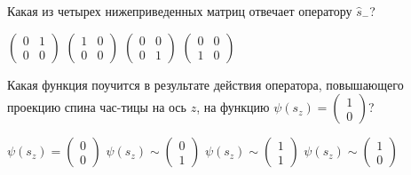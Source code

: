\documentclass[11pt,a4paper]{exam}
\begin{document}
\begin{questions}
\question Какая из четырех нижеприведенных матриц отвечает оператору ${\hat s_ - }$?
\begin{choices}
\choice $\left( {\begin{array}{*{20}{c}}
0&1\\
0&0
\end{array}} \right)$      
\choice $\left( {\begin{array}{*{20}{c}}
1&0\\
0&0
\end{array}} \right)$      
\choice $\left( {\begin{array}{*{20}{c}}
0&0\\
0&1
\end{array}} \right)$      
\choice $\left( {\begin{array}{*{20}{c}}
0&0\\
1&0
\end{array}} \right)$
\end{choices}

\question Какая функция поучится в результате действия оператора, повышающего проекцию спина час-тицы на ось $z$, на функцию $\psi ({s_z}) = \left( {\begin{array}{*{20}{c}}
1\\
0
\end{array}} \right)$?
\begin{choices}
\choice $\psi ({s_z}) = \left( {\begin{array}{*{20}{c}}
0\\
0
\end{array}} \right)$   
\choice $\psi ({s_z}) \sim \left( {\begin{array}{*{20}{c}}
0\\
1
\end{array}} \right)$   
\choice $\psi ({s_z}) \sim \left( {\begin{array}{*{20}{c}}
1\\
1
\end{array}} \right)$   
\choice $\psi ({s_z}) \sim \left( {\begin{array}{*{20}{c}}
1\\
0
\end{array}} \right)$
\end{choices}


\end{questions}
\end{document}
